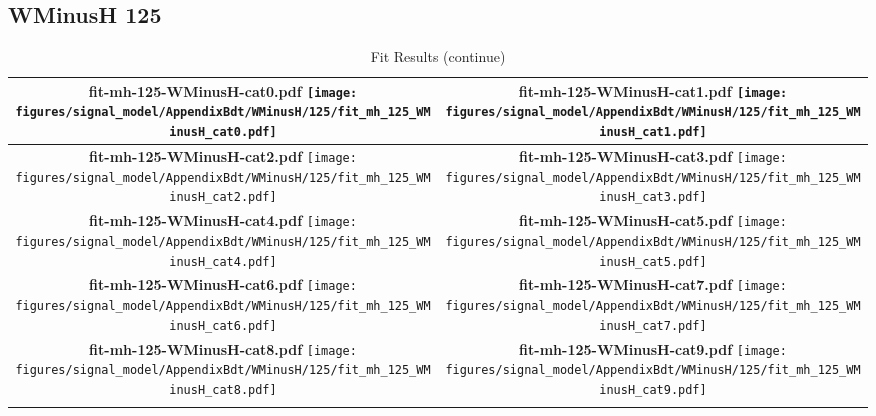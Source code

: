 \subsection{WMinusH 125}
\begin{longtable}{|c|c|}
\caption{Fit Results}
\endfirsthead
\caption{Fit Results (continue)}
\endhead
\hline
\parbox{0.47\textwidth}{
\centering
{\bfseries fit-mh-125-WMinusH-cat0.pdf}
\texttt{[image: figures/signal\_model/AppendixBdt/WMinusH/125/fit\_mh\_125\_WMinusH\_cat0.pdf]}
}
 & \parbox{0.47\textwidth}{
\centering
{\bfseries fit-mh-125-WMinusH-cat1.pdf}
\texttt{[image: figures/signal\_model/AppendixBdt/WMinusH/125/fit\_mh\_125\_WMinusH\_cat1.pdf]}
}
 \\
\hline
\parbox{0.47\textwidth}{
\centering
{\bfseries fit-mh-125-WMinusH-cat2.pdf}
\texttt{[image: figures/signal\_model/AppendixBdt/WMinusH/125/fit\_mh\_125\_WMinusH\_cat2.pdf]}
}
 & \parbox{0.47\textwidth}{
\centering
{\bfseries fit-mh-125-WMinusH-cat3.pdf}
\texttt{[image: figures/signal\_model/AppendixBdt/WMinusH/125/fit\_mh\_125\_WMinusH\_cat3.pdf]}
}
 \\
\hline
\parbox{0.47\textwidth}{
\centering
{\bfseries fit-mh-125-WMinusH-cat4.pdf}
\texttt{[image: figures/signal\_model/AppendixBdt/WMinusH/125/fit\_mh\_125\_WMinusH\_cat4.pdf]}
}
 & \parbox{0.47\textwidth}{
\centering
{\bfseries fit-mh-125-WMinusH-cat5.pdf}
\texttt{[image: figures/signal\_model/AppendixBdt/WMinusH/125/fit\_mh\_125\_WMinusH\_cat5.pdf]}
}
 \\
\hline
\parbox{0.47\textwidth}{
\centering
{\bfseries fit-mh-125-WMinusH-cat6.pdf}
\texttt{[image: figures/signal\_model/AppendixBdt/WMinusH/125/fit\_mh\_125\_WMinusH\_cat6.pdf]}
}
 & \parbox{0.47\textwidth}{
\centering
{\bfseries fit-mh-125-WMinusH-cat7.pdf}
\texttt{[image: figures/signal\_model/AppendixBdt/WMinusH/125/fit\_mh\_125\_WMinusH\_cat7.pdf]}
}
 \\
\hline
\parbox{0.47\textwidth}{
\centering
{\bfseries fit-mh-125-WMinusH-cat8.pdf}
\texttt{[image: figures/signal\_model/AppendixBdt/WMinusH/125/fit\_mh\_125\_WMinusH\_cat8.pdf]}
}
 & \parbox{0.47\textwidth}{
\centering
{\bfseries fit-mh-125-WMinusH-cat9.pdf}
\texttt{[image: figures/signal\_model/AppendixBdt/WMinusH/125/fit\_mh\_125\_WMinusH\_cat9.pdf]}
}
 \\
\hline
\parbox{0.47\textwidth}{
\centering
}
\end{longtable}
